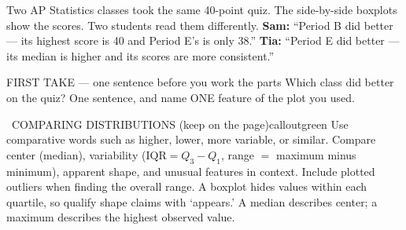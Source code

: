 \documentclass[11pt]{article}
\begin{document}


Two AP Statistics classes took the same 40-point quiz. The side-by-side boxplots show the scores. Two students read them differently. \textbf{Sam:} ``Period B did better --- its highest score is 40 and Period E's is only 38.'' \textbf{Tia:} ``Period E did better --- its median is higher and its scores are more consistent.''\par
\begin{center}
\end{center}
\begin{firsttakebox}{FIRST TAKE --- one sentence before you work the parts}
Which class did better on the quiz? One sentence, and name ONE feature of the plot you used.
\workspace{0.9in}
\end{firsttakebox}

\begin{callout}{\IconBook\ COMPARING DISTRIBUTIONS (keep on the page)}{calloutgreen}
Use comparative words such as higher, lower, more variable, or similar. Compare center (median), variability ($\mathrm{IQR}=Q_3-Q_1$, range $=$ maximum minus minimum), apparent shape, and unusual features in context. Include plotted outliers when finding the overall range. A boxplot hides values within each quartile, so qualify shape claims with `appears.' A median describes center; a maximum describes the highest observed value.
\end{callout}
\end{document}

